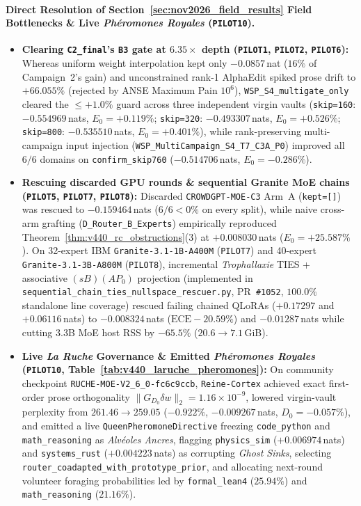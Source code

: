 \documentclass[11pt,a4paper]{article}
\begin{document}
\paragraph{Direct Resolution of Section~\ref{sec:nov2026_field_results} Field Bottlenecks \& Live \emph{Ph\'eromones Royales} (\texttt{PILOT10}).}
\begin{itemize}[leftmargin=1.6em,itemsep=2pt]
    \item \textbf{Clearing \texttt{C2\_final}'s \texttt{B3} gate at $6.35\times$ depth (\texttt{PILOT1}, \texttt{PILOT2}, \texttt{PILOT6}):} Whereas uniform weight interpolation kept only $-0.0857$\,nat ($16\%$ of Campaign~2's gain) and unconstrained rank-1 AlphaEdit spiked prose drift to $+66.055\%$ (rejected by ANSE Maximum Pain $10^6$), \texttt{WSP\_S4\_multigate\_only} cleared the $\le +1.0\%$ guard across three independent virgin vaults (\texttt{skip=160}: $-0.554969$\,nats, $E_0 = +0.119\%$; \texttt{skip=320}: $-0.493307$\,nats, $E_0 = +0.526\%$; \texttt{skip=800}: $-0.535510$\,nats, $E_0 = +0.401\%$), while rank-preserving multi-campaign input injection (\texttt{WSP\_MultiCampaign\_S4\_T7\_C3A\_P0}) improved all $6/6$ domains on \texttt{confirm\_skip760} ($-0.514706$\,nats, $E_0 = -0.286\%$).
    \item \textbf{Rescuing discarded GPU rounds \& sequential Granite MoE chains (\texttt{PILOT5}, \texttt{PILOT7}, \texttt{PILOT8}):} Discarded \texttt{CROWDGPT-MOE-C3} Arm~A (\texttt{kept=[]}) was rescued to $-0.159464$\,nats ($6/6 < 0\%$ on every split), while naive cross-arm grafting (\texttt{D\_Router\_B\_Experts}) empirically reproduced Theorem~\ref{thm:v440_rc_obstructions}(3) at $+0.008030$\,nats ($E_0 = +25.587\%$). On 32-expert IBM \texttt{Granite-3.1-1B-A400M} (\texttt{PILOT7}) and 40-expert \texttt{Granite-3.1-3B-A800M} (\texttt{PILOT8}), incremental \emph{Trophallaxie} TIES + associative $(sB)(AP_0)$ projection (implemented in \texttt{sequential\_chain\_ties\_nullspace\_rescuer.py}, PR~\texttt{\#1052}, $100.0\%$ standalone line coverage) rescued failing chained QLoRAs ($+0.17297$ and $+0.06116$\,nats) to $-0.008324$\,nats ($\mathrm{ECE} -20.59\%$) and $-0.01287$\,nats while cutting 3.3B MoE host RSS by $\mathbf{-65.5\%}$ ($20.6 \to 7.1$\,GiB).
    \item \textbf{Live \emph{La Ruche} Governance \& Emitted \emph{Ph\'eromones Royales} (\texttt{PILOT10}, Table~\ref{tab:v440_laruche_pheromones}):} On community checkpoint \texttt{RUCHE-MOE-V2\_6\_0-fc6c9ccb}, \texttt{Reine-Cortex} achieved exact first-order prose orthogonality $\|G_{D_0}\delta w\|_2 = 1.16\times 10^{-9}$, lowered virgin-vault perplexity from $261.46 \to 259.05$ ($-0.922\%$, $-0.009267$\,nats, $D_0 = -0.057\%$), and emitted a live \texttt{QueenPheromoneDirective} freezing \texttt{code\_python} and \texttt{math\_reasoning} as \emph{Alv\'eoles Ancres}, flagging \texttt{physics\_sim} ($+0.006974$\,nats) and \texttt{systems\_rust} ($+0.004223$\,nats) as corrupting \emph{Ghost Sinks}, selecting \texttt{router\_coadapted\_with\_prototype\_prior}, and allocating next-round volunteer foraging probabilities led by \texttt{formal\_lean4} ($25.94\%$) and \texttt{math\_reasoning} ($21.16\%$).

\end{itemize}
\end{document}
